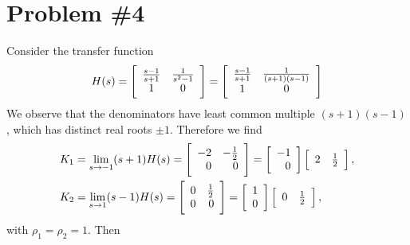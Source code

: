 \documentclass{article}
\begin{document}
\pagebreak

\section*{Problem \#4}
Consider the transfer function
$$
H(s) =
\left[\begin{array}{c c}
  \frac{s-1}{s+1} & \frac{1}{s^2 - 1} \\
  1               & 0
\end{array}\right] =
\left[\begin{array}{c c}
  \frac{s-1}{s+1} & \frac{1}{(s+1)(s-1)} \\
  1               & 0
\end{array}\right]
$$
We observe that the denominators have least common multiple
$(s+1)(s-1)$, which has distinct real roots $\pm 1$. Therefore we find
\begin{align*}
K_1 &= \lim_{s \to -1} (s + 1)H(s) =
\left[\begin{array}{r r}
 -2 & -\frac{1}{2} \\
  0 & 0
\end{array}\right] =
\left[\begin{array}{r}
 -1 \\
  0
\end{array}\right]
\left[\begin{array}{r r}
  2 & \frac{1}{2}
\end{array}\right], \\
K_2 &= \lim_{s \to 1} (s - 1)H(s) =
\left[\begin{array}{r r}
  0 & \frac{1}{2} \\
  0 & 0
\end{array}\right] =
\left[\begin{array}{r}
  1 \\
  0
\end{array}\right]
\left[\begin{array}{r r}
  0 & \frac{1}{2}
\end{array}\right],
\end{align*}
with $\rho_1 = \rho_2 = 1$. Then
\end{document}

